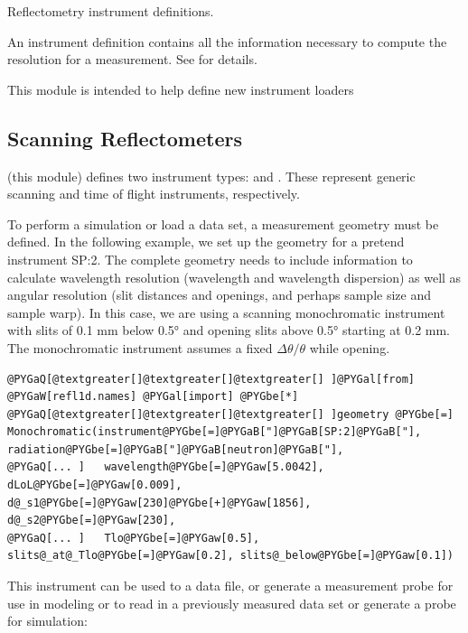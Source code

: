 \documentclass[letterpaper,10pt,english]{sphinxmanual}
\begin{document}
\label{api/instrument:module-refl1d.instrument}
Reflectometry instrument definitions.

An instrument definition contains all the information necessary to compute
the resolution for a measurement.  See  for details.

This module is intended to help define new instrument loaders


\subsection{Scanning Reflectometers}
\label{api/instrument:scanning-reflectometers}
{\hyperref[api/instrument:module-refl1d.instrument]{}} (this module) defines two instrument types:
{\hyperref[api/instrument:refl1d.instrument.Monochromatic]{}} and {\hyperref[api/instrument:refl1d.instrument.Pulsed]{}}. These represent
generic scanning and time of flight instruments, respectively.

To perform a simulation or load a data set, a measurement geometry must
be defined.  In the following example, we set up the geometry for a
pretend instrument SP:2. The complete geometry needs to include information
to calculate wavelength resolution (wavelength and wavelength dispersion)
as well as angular resolution (slit distances and openings, and perhaps
sample size and sample warp).  In this case, we are using a scanning
monochromatic instrument with slits of 0.1 mm below 0.5° and
opening slits  above 0.5° starting at 0.2 mm.  The monochromatic
instrument assumes a fixed $\Delta \theta / \theta$ while opening.

\begin{Verbatim}[commandchars=@\[\]]
@PYGaQ[@textgreater[]@textgreater[]@textgreater[] ]@PYGal[from] @PYGaW[refl1d.names] @PYGal[import] @PYGbe[*]
@PYGaQ[@textgreater[]@textgreater[]@textgreater[] ]geometry @PYGbe[=] Monochromatic(instrument@PYGbe[=]@PYGaB["]@PYGaB[SP:2]@PYGaB["], radiation@PYGbe[=]@PYGaB["]@PYGaB[neutron]@PYGaB["],
@PYGaQ[... ]   wavelength@PYGbe[=]@PYGaw[5.0042], dLoL@PYGbe[=]@PYGaw[0.009], d@_s1@PYGbe[=]@PYGaw[230]@PYGbe[+]@PYGaw[1856], d@_s2@PYGbe[=]@PYGaw[230],
@PYGaQ[... ]   Tlo@PYGbe[=]@PYGaw[0.5], slits@_at@_Tlo@PYGbe[=]@PYGaw[0.2], slits@_below@PYGbe[=]@PYGaw[0.1])
\end{Verbatim}

This instrument can be used to  a data file, or generate a
measurement probe for use in modeling or to read in a previously
measured data set or generate a probe for simulation:
\end{document}
